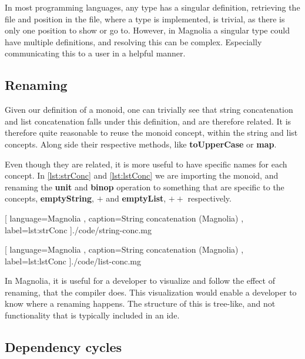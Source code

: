 In most programming languages, any type has a singular definition, retrieving
the file and position in the file, where a type is implemented, is trivial, as
there is only one position to show or go to. However, in Magnolia a singular
type could have multiple definitions, and resolving this can be complex.
Especially communicating this to a user in a helpful manner.


\subsection{Renaming}

Given our definition of a monoid\footnotemark[12]{}, one can trivially see that
string concatenation and list concatenation falls under this definition, and are
therefore related. It is therefore quite reasonable to reuse the monoid
concept, within the string and list concepts. Along side their respective
methods, like \textbf{toUpperCase} or \textbf{map}.

Even though they are related, it is more useful to have specific names for each
concept. In \ref{lst:strConc} and \ref{lst:lstConc} we are importing the
monoid\footnotemark{}, and renaming the \textbf{unit} and \textbf{binop}
operation to something that are specific to the concepts, \textbf{emptyString},
$+$ and \textbf{emptyList}, $++$ respectively.


\begin{code}[H]
  
    [ language=Magnolia
    , caption={String concatenation (Magnolia)}
    , label=lst:strConc
    ]{./code/string-conc.mg}
\end{code}

\begin{code}[H]
  
    [ language=Magnolia
    , caption={String concatenation (Magnolia)}
    , label=lst:lstConc
    ]{./code/list-conc.mg}
\end{code}

In Magnolia, it is useful for a developer to visualize and follow the effect of
renaming, that the compiler does. This visualization would enable a developer
to know where a renaming happens. The structure of this is tree-like, and not
functionality that is typically included in an \gls*{ide}.


\subsection{Dependency cycles}

